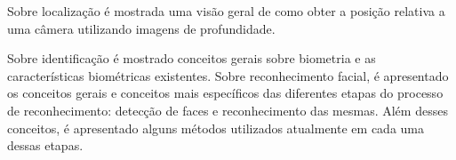 	Sobre localização é mostrada uma visão geral de como obter a posição relativa a uma câmera utilizando imagens de profundidade.

	Sobre identificação é mostrado conceitos gerais sobre biometria e as características biométricas existentes. Sobre reconhecimento facial, é apresentado os conceitos gerais e conceitos mais específicos das diferentes etapas do processo de reconhecimento: detecção de faces e reconhecimento das mesmas. Além desses conceitos, é apresentado alguns métodos utilizados atualmente em cada uma dessas etapas.










